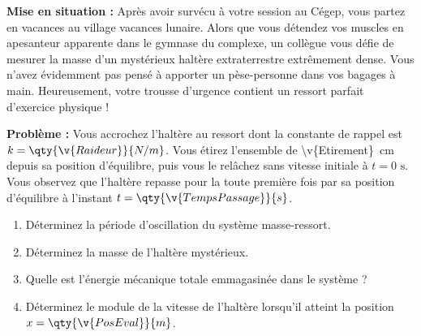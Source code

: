 \textbf{Mise en situation :} Après avoir survécu à votre session au Cégep, vous partez en vacances au village vacances lunaire. Alors que vous détendez vos muscles en apesanteur apparente dans le gymnase du complexe, un collègue vous défie de mesurer la masse d'un mystérieux haltère extraterrestre extrêmement dense. Vous n'avez évidemment pas pensé à apporter un pèse-personne dans vos bagages à main. Heureusement, votre trousse d'urgence contient un ressort parfait d'exercice physique !

\textbf{Problème :} Vous accrochez l'haltère au ressort dont la constante de rappel est $k = \qty{\v{Raideur}}{N/m}$. Vous étirez l'ensemble de \qty{\v{Etirement}}{cm} depuis sa position d'équilibre, puis vous le relâchez sans vitesse initiale à $t = 0\text{ s}$. Vous observez que l'haltère repasse pour la toute première fois par sa position d'équilibre à l'instant $t = \qty{\v{TempsPassage}}{s}$.

\begin{enumerate}[label=\alph*)]
    \item Déterminez la période d'oscillation du système masse-ressort.
    \item Déterminez la masse de l'haltère mystérieux.
    \item Quelle est l'énergie mécanique totale emmagasinée dans le système ?
    \item Déterminez le module de la vitesse de l'haltère lorsqu'il atteint la position $x = \qty{\v{PosEval}}{m}$.
\end{enumerate}